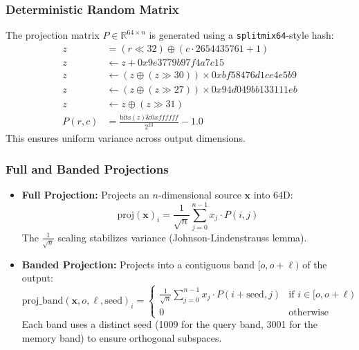 \documentclass[12pt]{article}
\begin{document}
\subsubsection{Deterministic Random Matrix}
The projection matrix $P \in \mathbb{R}^{64 \times n}$ is generated
using a \texttt{splitmix64}-style hash:
\begin{align}
    z &= (r \ll 32) \oplus (c \cdot 2654435761 + 1) \\
    z &\leftarrow z + 0x9e3779b97f4a7c15 \\
    z &\leftarrow (z \oplus (z \gg 30)) \times 0xbf58476d1ce4e5b9 \\
    z &\leftarrow (z \oplus (z \gg 27)) \times 0x94d049bb133111eb \\
    z &\leftarrow z \oplus (z \gg 31) \\
    P(r, c) &= \frac{\text{bits}(z) \& 0xffffff}{2^{23}} - 1.0
\end{align}
This ensures uniform variance across output dimensions.

\subsubsection{Full and Banded Projections}
\begin{itemize}
    \item \textbf{Full Projection:}
    Projects an $n$-dimensional source $\mathbf{x}$ into 64D:
    \begin{equation}
        \text{proj}(\mathbf{x})_i = \frac{1}{\sqrt{n}}
        \sum_{j=0}^{n-1} x_j \cdot P(i, j)
    \end{equation}
    The $\frac{1}{\sqrt{n}}$ scaling stabilizes variance
    (Johnson-Lindenstrauss lemma).

    \item \textbf{Banded Projection:}
    Projects into a contiguous band $[o, o + \ell)$ of the output:
    \begin{equation}
        \text{proj\_band}(\mathbf{x}, o, \ell, \text{seed})_i =
        \begin{cases}
            \frac{1}{\sqrt{n}} \sum_{j=0}^{n-1} x_j \cdot
            P(i + \text{seed}, j) & \text{if } i \in [o, o+\ell) \\
            0 & \text{otherwise}
        \end{cases}
    \end{equation}
    Each band uses a distinct seed (1009 for the query band, 3001 for
    the memory band) to ensure orthogonal subspaces.
\end{itemize}
\end{document}
